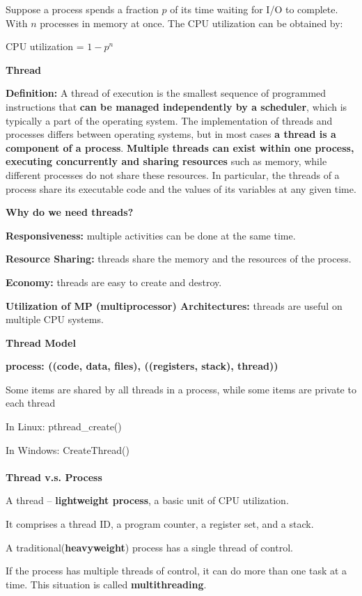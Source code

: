 \documentclass[]{report}
\begin{document}
Suppose a process spends a fraction $p$ of its time
waiting for I/O to complete. With $n$ processes in
memory at once. The CPU utilization can be
obtained by:
\begin{center}
	CPU utilization = $1 - p^n$
\end{center}
\textbf{Thread}

\textbf{Definition: }A thread of execution is the smallest sequence of programmed
instructions that \textbf{can be managed independently by a scheduler},
which is typically a part of the operating system. The implementation
of threads and processes differs between operating systems, but in
most cases \textbf{a thread is a component of a process}. \textbf{Multiple threads
can exist within one process, executing concurrently and sharing
resources} such as memory, while different processes do not share
these resources. In particular, the threads of a process share its
executable code and the values of its variables at any given time.

\textbf{Why do we need threads?}

\textbf{Responsiveness:} multiple activities can be done at the
same time.

\textbf{Resource Sharing:} threads share the memory and the
resources of the process.

\textbf{Economy: }threads are easy to create and destroy.

\textbf{Utilization of MP (multiprocessor) Architectures:}
threads are useful on multiple CPU systems.

\textbf{Thread Model}

\textbf{process: ((code, data, files), ((registers, stack), thread))}

Some items are shared by all threads in a process,
while some items are private to each thread

In Linux: pthread\_create()

In Windows: CreateThread()\\\\
\textbf{Thread v.s. Process}

A thread – \textbf{lightweight process}, a basic unit of CPU
utilization.

It comprises a thread ID, a program counter, a register set,
and a stack.

A traditional(\textbf{heavyweight}) process has a single thread of
control.

If the process has multiple threads of control, it can do
more than one task at a time. This situation is called
\textbf{multithreading}.
\end{document}
